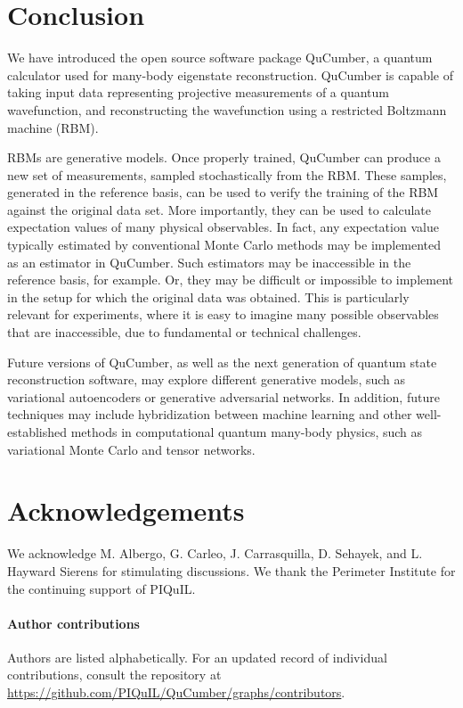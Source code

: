 \documentclass[submission, Phys, hidelnks]{SciPost}
\begin{document}
\section{Conclusion}

We have introduced the open source software package QuCumber, a quantum calculator used for many-body eigenstate
reconstruction. QuCumber is capable of taking input data representing projective measurements of a quantum wavefunction, and 
reconstructing the wavefunction using a restricted Boltzmann machine (RBM).

RBMs are generative models.  Once properly trained, QuCumber can produce a new set of measurements, sampled stochastically from the RBM.  These samples,  generated in the reference basis, can be used to verify the training of the RBM against the original data set.  More importantly, they can be used to calculate expectation values of many physical observables.
In fact,
any expectation value typically estimated by conventional Monte Carlo methods may be implemented as an estimator in QuCumber.  Such estimators may be inaccessible in the reference basis, for example.  Or, they may be difficult or impossible to implement in the
setup for which the original data was obtained.  This is particularly relevant for experiments, where it is easy to imagine many possible observables that are inaccessible, due to fundamental or technical challenges.

Future versions of QuCumber, as well as the next generation of quantum state reconstruction software, may explore different generative models, such as variational autoencoders or generative adversarial networks.
In addition, future techniques may include hybridization between machine learning and other well-established methods in 
computational quantum many-body physics, such as variational Monte Carlo and tensor networks.

\section*{Acknowledgements}
We acknowledge M. Albergo, G. Carleo, J. Carrasquilla, D. Sehayek, and L. Hayward Sierens for stimulating discussions. 
We thank the Perimeter Institute for the continuing support of PIQuIL.

\paragraph{Author contributions}
Authors are listed alphabetically. For an updated record of individual contributions, consult the repository at \url{https://github.com/PIQuIL/QuCumber/graphs/contributors}.
\end{document}

